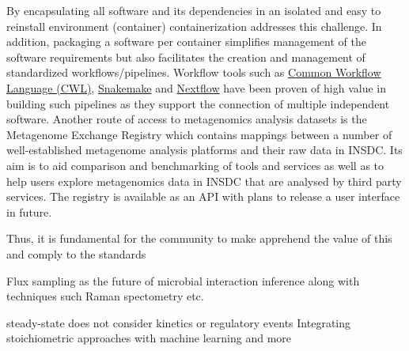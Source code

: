 By encapsulating all software and its dependencies in an isolated and easy to reinstall environment (container) containerization addresses this challenge. In addition, packaging a software per container simplifies management of the software requirements but also facilitates the creation and management of standardized workflows/pipelines. Workflow tools such as 
\href{https://github.com/common-workflow-language/common-workflow-language}{Common Workflow Language (CWL)}, 
\href{https://snakemake.github.io}{Snakemake} and \href{https://www.nextflow.io}{Nextflow} have been proven of high value in building such pipelines as they support the connection of multiple independent software.
Another route of access to metagenomics analysis datasets is the Metagenome Exchange Registry which contains mappings between a number of well-established metagenome analysis platforms and their raw data in INSDC. Its aim is to aid comparison and benchmarking of tools and services as well as to help users explore metagenomics data in INSDC that are analysed by third party services. The registry is available as an API with plans to release a user interface in future.





Thus, it is fundamental for the community to make apprehend the value of 
this and comply to the standards~\cite{}




Flux sampling as the future of microbial interaction inference 
along with techniques such Raman spectometry etc.


steady-state does not consider kinetics or regulatory events
Integrating stoichiometric approaches with machine learning and more~\cite{sahu2021advances}